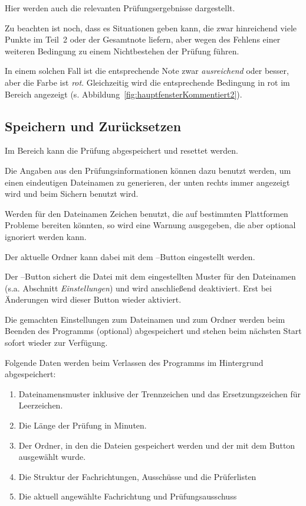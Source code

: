 \documentclass[a4paper,notitlepage,parskip=half]{scrartcl}
\newcommand*\circled[1]{\tikz[baseline=(char.base)]{
            \node[shape=circle,draw,inner sep=2pt] (char) {#1};}}
\begin{document}
Hier werden auch die relevanten Prüfungsergebnisse dargestellt.

Zu beachten ist noch, dass es Situationen geben kann, die zwar hinreichend viele Punkte im Teil~2 oder der Gesamtnote liefern, aber wegen des Fehlens einer weiteren Bedingung zu einem Nichtbestehen der Prüfung führen.

In einem solchen Fall ist die entsprechende Note zwar \emph{ausreichend} oder besser, aber die Farbe ist \emph{rot}. Gleichzeitig wird die entsprechende Bedingung in rot im Bereich \circled{E} angezeigt (s. Abbildung~\ref{fig:hauptfensterKommentiert2}).

\subsection{Speichern und Zurücksetzen}
Im Bereich \circled{E} kann die Prüfung abgespeichert und resettet werden.

Die Angaben aus den Prüfungsinformationen können dazu benutzt werden, um einen eindeutigen Dateinamen zu generieren, der unten rechts immer angezeigt wird und beim Sichern benutzt wird. 

Werden für den Dateinamen Zeichen benutzt, die auf bestimmten Plattformen Probleme bereiten könnten, so wird eine Warnung ausgegeben, die aber optional ignoriert werden kann. 

Der aktuelle Ordner kann dabei mit dem --Button eingestellt werden.

Der --Button sichert die Datei mit dem eingestellten Muster für den Dateinamen (s.a. Abschnitt \emph{Einstellungen}) und wird anschließend deaktiviert. Erst bei Änderungen wird dieser Button wieder aktiviert.

Die gemachten Einstellungen zum Dateinamen und zum Ordner werden beim Beenden des Programms (optional) abgespeichert und stehen beim nächsten Start sofort wieder zur Verfügung.

Folgende Daten werden beim Verlassen des Programms im Hintergrund abgespeichert:
\begin{enumerate}
\item Dateinamensmuster inklusive der Trennzeichen und das Ersetzungszeichen für Leerzeichen.
\item Die Länge der Prüfung in Minuten.
\item Der Ordner, in den die Dateien gespeichert werden und der mit dem  Button ausgewählt wurde.
\item Die Struktur der Fachrichtungen, Ausschüsse und die Prüferlisten
\item Die aktuell angewählte Fachrichtung und Prüfungsausschuss
\end{enumerate}
 
\end{document}
